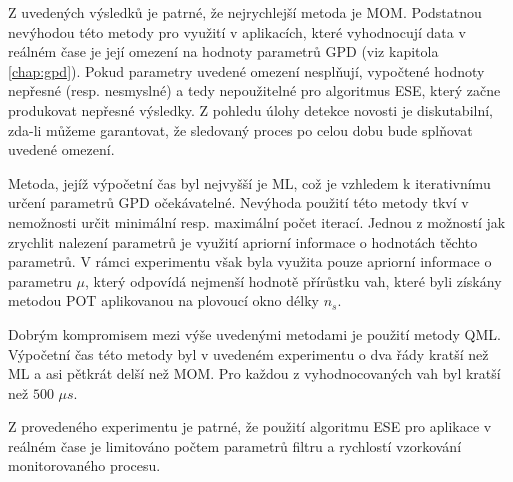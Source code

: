Z uvedených výsledků je patrné, že nejrychlejší metoda je MOM. Podstatnou nevýhodou této metody pro využití v aplikacích, které vyhodnocují data v reálném čase je její omezení na hodnoty parametrů GPD (viz kapitola \ref{chap:gpd}). Pokud parametry uvedené omezení nesplňují, vypočtené hodnoty nepřesné (resp. nesmyslné) a tedy nepoužitelné pro algoritmus ESE, který začne produkovat nepřesné výsledky. Z pohledu úlohy detekce novosti je diskutabilní, zda-li můžeme garantovat, že sledovaný proces po celou dobu bude splňovat uvedené omezení.
\par
Metoda, jejíž výpočetní čas byl nejvyšší je ML, což je vzhledem k iterativnímu určení parametrů GPD očekávatelné. Nevýhoda použití této metody tkví v  nemožnosti určit minimální resp. maximální počet iterací. Jednou z možností jak zrychlit nalezení parametrů je využití apriorní informace o hodnotách těchto parametrů. V rámci experimentu však byla využita pouze apriorní informace o parametru $\mu$, který odpovídá nejmenší hodnotě přírůstku vah, které byli získány metodou POT aplikovanou na plovoucí okno délky $n_s$.
\par
Dobrým kompromisem mezi výše uvedenými metodami je použití metody QML. Výpočetní čas této metody byl v uvedeném experimentu o dva řády kratší než ML a asi pětkrát delší než MOM. Pro každou z vyhodnocovaných vah byl kratší než $500$ $\mu s$.
\par 
Z provedeného experimentu je patrné, že použití algoritmu ESE pro aplikace v reálném čase je limitováno počtem parametrů filtru a rychlostí vzorkování monitorovaného procesu. 







 